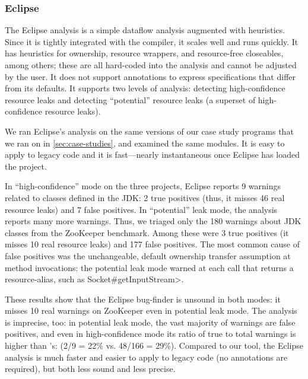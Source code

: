 \subsubsection{Eclipse}
\label{sec:eclipse}

The Eclipse analysis is a simple dataflow analysis
augmented with heuristics. Since it is tightly integrated with
the compiler, it scales well and runs quickly. It has
heuristics for ownership, resource wrappers, and resource-free
closeables, among others; these are all hard-coded into the analysis and cannot
be adjusted by the user. It does not support annotations to express
specifications that differ from its defaults.
It supports two levels of analysis: detecting high-confidence resource
leaks and detecting ``potential'' resource
leaks (a superset of high-confidence resource leaks).

We ran Eclipse's analysis on the same versions of our case study programs
that we ran \tool on in \cref{sec:case-studies}, and examined
the same modules. It is easy to apply
to legacy code and it is fast---nearly instantaneous once Eclipse
has loaded the project.

In ``high-confidence'' mode on the three projects, Eclipse reports 9
warnings related to classes defined in the JDK:
2 true positives (thus, it misses 46 real resource leaks) and 7
false positives.
In ``potential'' leak mode, the analysis reports many more warnings.
Thus, we triaged only the 180
warnings about JDK classes from the ZooKeeper benchmark.
Among these were 3 true positives (it misses 10 real resource leaks) and 177 false
positives.
The most common cause of false
positives was the unchangeable, default ownership transfer assumption
at method invocations:
the potential leak mode warned at each call that returns a resource-alias, such as
\<Socket\#getInputStream>.

These results show that the Eclipse bug-finder is unsound in both
modes: it misses 10 real warnings on ZooKeeper even in potential leak mode.
The analysis is imprecise, too: in potential leak mode,
the vast majority of warnings are false positives, and even in high-confidence
mode its ratio of true to total warnings is higher than \tool's: (2/9 = 22\%
vs. 48/166 = 29\%).
Compared to our tool, the Eclipse analysis
is much faster and easier to apply to legacy code
(no annotations are required), but both less sound
and less precise.

